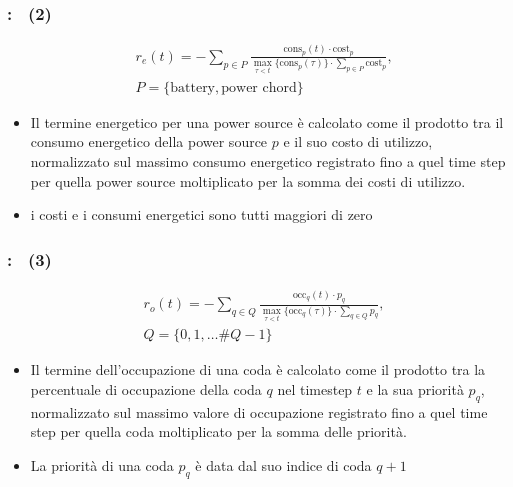 \documentclass[compress]{beamer}
\begin{document}
\begin{frame}
    \frametitle{\subsecname: \subsubsecname\ (2)}
    \begin{Definition}
        \begin{equation}
            \label{eq:reward_energy}
            \begin{aligned}
                & r_e(t) = -\sum_{p \in P}\frac{\text{cons}_p(t) \cdot \text{cost}_p}{\max_{\tau < t}\{\text{cons}_p(\tau)\} \cdot \sum_{p \in P}\text{cost}_p},\\
                & P = \{\text{battery}, \text{power chord}\} 
            \end{aligned}
        \end{equation}
    \end{Definition}
    \begin{itemize}
        \item Il termine energetico per una power source è calcolato come il prodotto tra il consumo energetico della power source $p$ e il
        suo costo di utilizzo, normalizzato sul massimo consumo energetico registrato fino
        a quel time step per quella power source moltiplicato per la somma dei costi di utilizzo.
        \item i costi e i consumi energetici sono tutti maggiori di zero
    \end{itemize}
\end{frame}
\begin{frame}
    \frametitle{\subsecname: \subsubsecname\ (3)}
    \begin{Definition}
        \begin{equation}
            \label{eq:reward_occupancy}
            \begin{aligned}
                & r_o(t) = -\sum_{q \in Q}\frac{\text{occ}_q(t) \cdot p_q}{\max_{\tau < t}\{\text{occ}_q(\tau)\} \cdot \sum_{q \in Q}p_q},\\
                & Q = \{0, 1, \dots \#Q - 1\} 
            \end{aligned}
        \end{equation}
    \end{Definition}
    \begin{itemize}
        \item Il termine dell'occupazione di una coda è calcolato come il prodotto tra la percentuale di occupazione della coda $q$ nel 
        timestep $t$ e la sua priorità $p_q$, normalizzato sul massimo valore di occupazione
        registrato fino a quel time step per quella coda moltiplicato per la somma delle priorità.
        \item La priorità di una coda $p_q$ è data dal suo indice di coda $q + 1$ 
    \end{itemize}
\end{frame}
\end{document}
